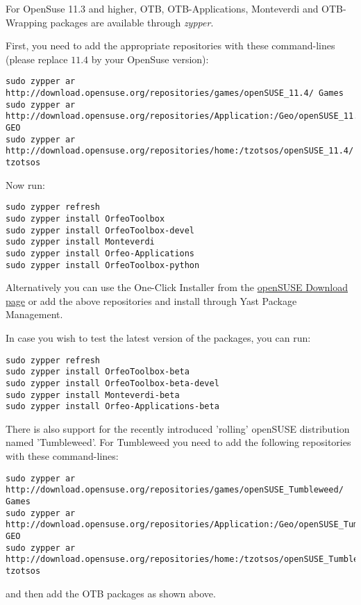 For OpenSuse 11.3 and higher, OTB, OTB-Applications, Monteverdi and 
OTB-Wrapping packages are available through \emph{zypper}.

First, you need to add the appropriate repositories with these command-lines (please replace $11.4$ by your OpenSuse version):
\begin{verbatim}
sudo zypper ar 
http://download.opensuse.org/repositories/games/openSUSE_11.4/ Games
sudo zypper ar 
http://download.opensuse.org/repositories/Application:/Geo/openSUSE_11.4/ GEO
sudo zypper ar 
http://download.opensuse.org/repositories/home:/tzotsos/openSUSE_11.4/ tzotsos
\end{verbatim}

Now run:
\begin{verbatim}
sudo zypper refresh
sudo zypper install OrfeoToolbox
sudo zypper install OrfeoToolbox-devel
sudo zypper install Monteverdi
sudo zypper install Orfeo-Applications
sudo zypper install OrfeoToolbox-python
\end{verbatim}

Alternatively you can use the One-Click Installer from the \href{http://software.opensuse.org/search?q=Orfeo&baseproject=openSUSE\%3A11.4&lang=en&include_home=true&exclude_debug=true}{openSUSE Download page} or add the above repositories and install through Yast Package Management.

In case you wish to test the latest version of the packages, you can run:
\begin{verbatim}
sudo zypper refresh
sudo zypper install OrfeoToolbox-beta
sudo zypper install OrfeoToolbox-beta-devel
sudo zypper install Monteverdi-beta
sudo zypper install Orfeo-Applications-beta
\end{verbatim}

There is also support for the recently introduced 'rolling' openSUSE distribution named 'Tumbleweed'.
For Tumbleweed you need to add the following repositories with these command-lines:
\begin{verbatim}
sudo zypper ar 
http://download.opensuse.org/repositories/games/openSUSE_Tumbleweed/ Games
sudo zypper ar 
http://download.opensuse.org/repositories/Application:/Geo/openSUSE_Tumbleweed/ GEO
sudo zypper ar 
http://download.opensuse.org/repositories/home:/tzotsos/openSUSE_Tumbleweed/ tzotsos
\end{verbatim}
and then add the OTB packages as shown above.


